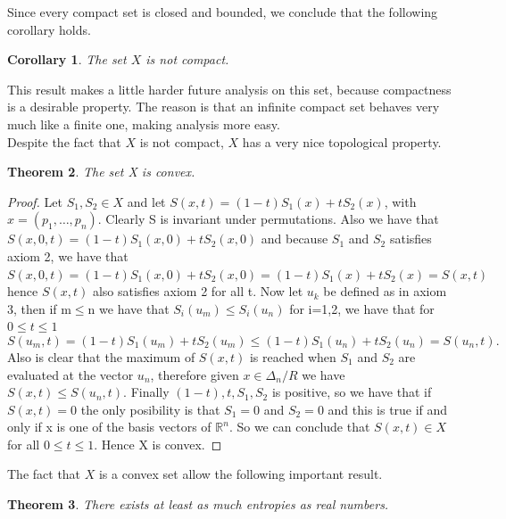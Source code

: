 \documentclass[11pt]{article}
\theoremstyle{plain}
\newtheorem{theorem}{Theorem}[section]
\newtheorem{corollary}[theorem]{Corollary}
\begin{document}
Since every compact set is closed and bounded, we conclude that the following corollary holds.
\begin{corollary}
The set $X$ is not compact.
\end{corollary}


This result makes a little harder future analysis on this set,
because compactness is a desirable property. The reason is that an
infinite compact set behaves very much like a finite one, making
analysis more easy.\medskip
\\
Despite the fact that $X$ is not compact, $X$ has a very nice
topological property.

\begin{theorem}\label{thm:convex}
The set X is convex.
\end{theorem}

\begin{proof}
Let $S_{1},S_{2}\in X$ and let $S(x,t)=(1-t)S_{1}(x)+tS_{2}(x)$,
with $x=(p_{1},\ldots,p_{n})$. Clearly S is invariant under
permutations. Also we have that
$S(x,0,t)=(1-t)S_{1}(x,0)+tS_{2}(x,0)$ and because $S_{1}$ and
$S_{2}$ satisfies axiom 2, we have that
$S(x,0,t)=(1-t)S_{1}(x,0)+tS_{2}(x,0)=(1-t)S_{1}(x)+tS_{2}(x)=S(x,t)$
hence $S(x,t)$ also satisfies axiom 2 for all t. Now let $u_{k}$
be defined as in axiom 3, then if m$\leq$n we have that
$S_{i}(u_{m})\leq S_{i}(u_{n})$ for i=1,2, we have that for $0\leq
t\leq 1$
\begin{equation}
S(u_{m},t)=(1-t)S_{1}(u_{m})+tS_{2}(u_{m})\leq
(1-t)S_{1}(u_{n})+tS_{2}(u_{n})=S(u_{n},t).
\end{equation}
Also is clear that the maximum of $S(x,t)$ is reached when $S_{1}$
and $S_{2}$ are evaluated at the vector $u_{n}$, therefore given
$x\in \Delta_{n}/R$ we have $S(x,t)\leq S(u_{n},t)$.\smallskip
Finally  $(1-t),t,S_{1},S_{2}$ is positive, so we have that if
$S(x,t)=0$ the only posibility is that $S_{1}=0$ and $S_{2}=0$ and
this is true if and only if x is one of the basis vectors of
$\mathbb{R}^{n}$. So we can conclude that $S(x,t)\in X$ for all
$0\leq t\leq 1$. Hence X is convex.
\end{proof}

The fact that $X$ is a convex set allow the following important
result.

\begin{theorem}
There exists at least as much entropies as real numbers.
\end{theorem}
\end{document}
